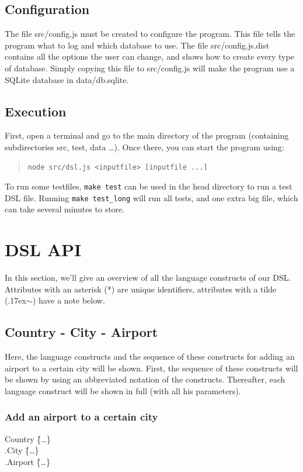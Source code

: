 \documentclass[a4paper,11pt]{article}
\newcommand{\npar}{\par \vspace{2.3ex plus 0.3ex minus 0.3ex} \noindent}
\newcommand{\mytilde}{{\raise.17ex\hbox{\(\scriptstyle\sim\)}}}
\begin{document}
\subsection{Configuration}
The file src/config.js must be created to configure the program. This file tells the program what to log and which database to use. The file src/config.js.dist contains all the options the user can change, and shows how to create every type of database. Simply copying this file to src/config.js will make the program use a SQLite database in data/db.sqlite.

\subsection{Execution}
First, open a terminal and go to the main directory of the program (containing subdirectories src, test, data \ldots). Once there, you can start the program using:
\begin{quote}\begin{verbatim}
node src/dsl.js <inputfile> [inputfile ...]
\end{verbatim}\end{quote}

\npar To run some testfiles, \texttt{make test} can be used in the head directory to run a test DSL file. Running \texttt{make test\_long} will run all tests, and one extra big file, which can take several minutes to store.

\clearpage


\clearpage
\appendix
\section{DSL API}
In this section, we'll give an overview of all the language constructs of our DSL. Attributes with an asterisk (*) are unique identifiers, attributes with a tilde (\mytilde) have a note below.

\subsection*{Country - City - Airport}
Here, the language constructs and the sequence of these constructs for adding an airport to a certain city will be shown. First, the sequence of these constructs will be shown by using an abbreviated notation of the constructs. Thereafter, each language construct will be shown in full (with all his parameters).

\subsubsection*{Add an airport to a certain city}
\begin{tabbing}
Country \= \{\ldots \} \\
\> .City \= \{\ldots \} \\
\> \> .Airport \= \{\ldots \} \\
\end{tabbing}
\end{document}
